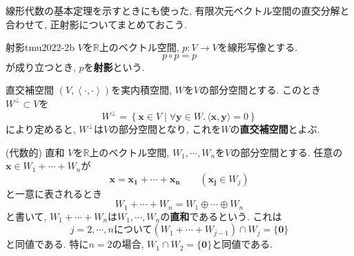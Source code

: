 \documentclass[titlepage]{jsarticle}
\numberwithin{equation}{section}
\newcommand{\R}{\mathbb{R}}%
\begin{document}
線形代数の基本定理を示すときにも使った, 有限次元ベクトル空間の直交分解と合わせて, 正射影についてまとめておこう.
\begin{dfn}{射影}{tmu2022-2b}
$V$を$\R$上のベクトル空間, $p : V \to V$を線形写像とする.
\[
p \circ p = p
\]
が成り立つとき, $p$を\textbf{射影}という.
\end{dfn}
\begin{dfn}{直交補空間}{}
$(V, \left\langle \cdot, \cdot \right\rangle)$を実内積空間, $W$を$V$の部分空間とする. このとき$W^\perp \subset V$を
\[
W^\perp = \left\{\bm{x} \in V \mid \forall \bm{y}\in W.\,\langle \bm{x}, \bm{y}\rangle = 0\right\}
\]
により定めると, $W^\perp$は$V$の部分空間となり, これを$W$の\textbf{直交補空間}とよぶ.
\end{dfn}
\begin{dfn}{(代数的) 直和}{}
$V$を$\R$上のベクトル空間, $W_1, \cdots, W_n$を$V$の部分空間とする. 任意の$\bm{x}\in W_1+\cdots+W_n$が
\[
\bm{x} = \bm{x_1}+\cdots+\bm{x_n}\qquad(\bm{x_j}\in W_j)
\]
と一意に表されるとき
\[
W_1+\cdots+W_n = W_1 \oplus \cdots \oplus W_n
\]
と書いて, $W_1+\cdots+W_n$は$W_1,\cdots,W_n$の\textbf{直和}であるという. これは
\[
j=2, \cdots, n\text{について} (W_1+\cdots+W_{j-1})\cap W_j = \{\bm{0}\}
\]
と同値である. 特に$n=2$の場合, $W_1 \cap W_2 = \{\bm{0}\}$と同値である.
\end{dfn}
\end{document}
